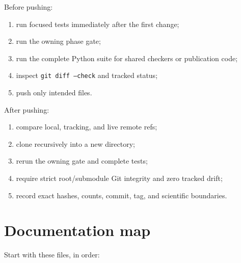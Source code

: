 \documentclass[11pt]{article}
\begin{document}
Before pushing:

\begin{enumerate}
\item run focused tests immediately after the first change;
\item run the owning phase gate;
\item run the complete Python suite for shared checkers or publication code;
\item inspect \texttt{git diff\allowbreak{} --check} and tracked status;
\item push only intended files.
\end{enumerate}

After pushing:

\begin{enumerate}
\item compare local, tracking, and live remote refs;
\item clone recursively into a new directory;
\item rerun the owning gate and complete tests;
\item require strict root/submodule Git integrity and zero tracked drift;
\item record exact hashes, counts, commit, tag, and scientific boundaries.
\end{enumerate}

\section{Documentation map}

Start with these files, in order:
\end{document}
